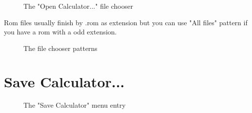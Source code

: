 \documentclass[10pt]{report}
\begin{document}
\begin{figure}[H]
\centering
{}
\caption{The "Open Calculator..." file chooser}
\end{figure}
Rom files usually finish by .rom as extension but you can use "All files" pattern if you have a rom with a odd extension.\newline
\begin{figure}[H]
\centering
{}
\caption{The file chooser patterns}
\end{figure}


\section{Save Calculator...}

\begin{figure}[H]
\centering
{}
\caption{The "Save Calculator" menu entry}
\end{figure}
\end{document}
